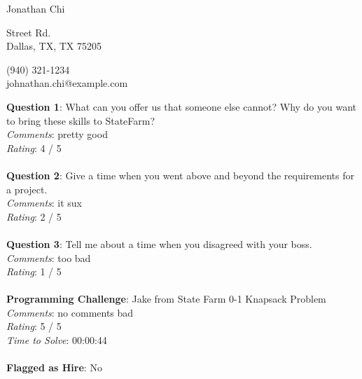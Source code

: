 \documentclass[12pt]{article}
\begin{document}
{\LARGE \begin{center}Jonathan Chi\end{center}}

\begin{multicols}{2}
 Street Rd. \\
Dallas, TX, TX 75205
\columnbreak

\noindent
(940) 321-1234 \\
johnathan.chi@example.com
\end{multicols}

\noindent
\textbf{Question 1}: What can you offer us that someone else cannot? Why do you want to bring these skills to StateFarm?
\\\noindent
\textit{Comments}: pretty good
\\\noindent
\textit{Rating}: 4 / 5
\\\\
\noindent
\textbf{Question 2}: Give a time when you went above and beyond the requirements for a project.
\\\noindent
\textit{Comments}: it sux
\\\noindent
\textit{Rating}: 2 / 5
\\\\
\noindent
\textbf{Question 3}: Tell me about a time when you disagreed with your boss.
\\\noindent
\textit{Comments}: too bad
\\\noindent
\textit{Rating}: 1 / 5
\\\\
\noindent
\textbf{Programming Challenge}: Jake from State Farm 0-1 Knapsack Problem
\\\noindent
\textit{Comments}: no comments bad 
\\\noindent
\textit{Rating}: 5 / 5
\\\noindent
\textit{Time to Solve}: 00:00:44
\\\\
\textbf{Flagged as Hire}: No
\\\\ 
\end{document}
